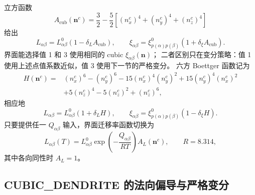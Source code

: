 \documentclass[UTF8,a4paper,11pt]{ctexart}
\newcommand{\vct}[1]{\bm{#1}}
\begin{document}
立方函数
\begin{equation}
 A_{\mathrm{cub}}(\vct n^c)
 =\frac32-\frac52\left[(n_x^c)^4+(n_y^c)^4+(n_z^c)^4\right]
\end{equation}
给出
\begin{equation}
 L_{\alpha\beta}=L^0_{\alpha\beta}(1-\delta_LA_{\mathrm{cub}}),
 \qquad
 \xi_{\alpha\beta}=\xi^0_{p(\alpha)p(\beta)}(1+\delta_\xi A_{\mathrm{cub}}).
\end{equation}
界面能选择值 1 和 3 使用相同的 cubic $\xi_{\alpha\beta}(\vct n)$；
二者区别只在变分策略：值 1 使用上述点值系数近似，值 3 使用下一节的严格变分。
六方 Boettger 函数记为
\begin{align}
 H(\vct n^c)={}&(n_x^c)^6-(n_y^c)^6
 -15(n_x^c)^4(n_y^c)^2+15(n_y^c)^4(n_x^c)^2\nonumber\\
 &+5(n_z^c)^4-5(n_z^c)^2+(n_z^c)^6,
\end{align}
相应地
\begin{equation}
 L_{\alpha\beta}=L^0_{\alpha\beta}(1+\delta_LH),
 \qquad
 \xi_{\alpha\beta}=\xi^0_{p(\alpha)p(\beta)}(1-\delta_\xi H).
\end{equation}
只要提供任一 $Q_{\alpha\beta}$ 输入，界面迁移率函数切换为
\begin{equation}
 L_{\alpha\beta}(T)=L^0_{\alpha\beta}
 \exp\!\left(-\frac{Q_{\alpha\beta}}{RT}\right)A_L(\vct n^c),
 \qquad R=8.314,
\end{equation}
其中各向同性时 $A_L=1$。

\subsection{CUBIC\_DENDRITE 的法向偏导与严格变分}
\end{document}

